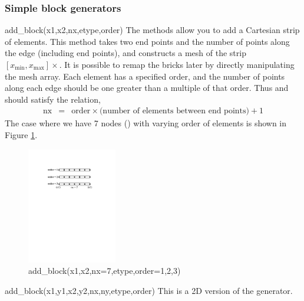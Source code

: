 \subsubsection{Simple block generators}
\begin{codelist}
  \item[add\_block(x1,x2,nx,etype,order)]
    The  methods allow you to add a Cartesian strip of
    elements.  This method takes two end points  and the 
    number of points along the edge (including end points), and constructs 
    a mesh of the strip $[x_{\min}, x_{\max}] \times$.  It is possible to
    remap the bricks later by directly manipulating the mesh 
    array.  Each element has a specified order, and the number of points
    along each edge should be one greater than a multiple of that order.
    Thus  and  should satisfy the relation,
    \begin{eqnarray}
      \text{nx} &=& \text{order} \times
                    \text{(number of elements between end points)}
                    + 1 \nonumber
    \end{eqnarray}
    The case where we have 7 nodes () with varying order of
    elements is shown in Figure \ref{fig:AddBlock1D}.
    \begin{figure}[htbp]
    \centering
    \includegraphics[trim=1.5in 6.5in 2.0in 1.6in, clip, height=2in]{fig/add_blocks1d.pdf}
    \caption{add\_block(x1,x2,nx=7,etype,order=1,2,3)}
    \label{fig:AddBlock1D}
    \end{figure}

\clearpage
  \item[add\_block(x1,y1,x2,y2,nx,ny,etype,order)]
    This is a 2D version of the  generator.


\end{codelist}
